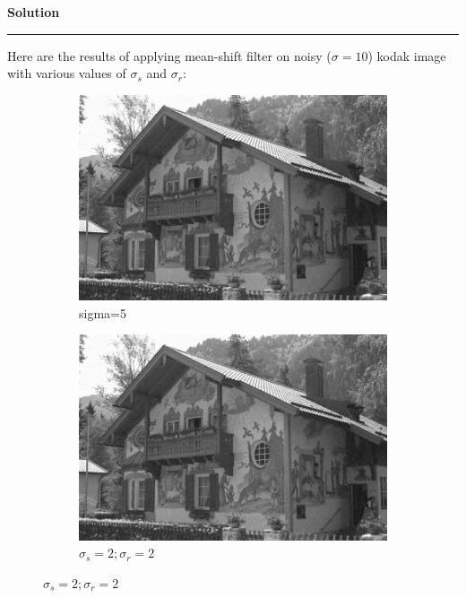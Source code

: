 \documentclass[a4paper]{article}
\newenvironment{solution}[2][]{%
    \begin{mdframed}[linecolor=green!60!black, linewidth=2pt, roundcorner=10pt, backgroundcolor=green!5!white, skipabove=12pt, skipbelow=12pt]%
        \textbf{\large #2} %
        \par\noindent\rule{\textwidth}{0.4pt} %
        \vspace{0.5em} %
}{%
    \end{mdframed}%
}
\begin{document}
\begin{solution}{Solution}
Here are the results of applying mean-shift filter on noisy ($\sigma = 10$) kodak image with various values of $\sigma_s$ and $\sigma_r$:

\begin{figure}[H]
    \centering
    \begin{subfigure}[b]{0.24\textwidth}
        \centering
        \includegraphics[width=\textwidth]{../images/noisy_kodak24_sigma_10.png}
        \caption{sigma=5}
        \label{Noisy }
    \end{subfigure}
    \begin{subfigure}[b]{0.24\textwidth}
        \centering
        \includegraphics[width=\textwidth]{../images/filtered_kodak24_meanshift_sigma_10_sigma_s_2_sigma_r_2.png}
        \caption{$\sigma_s=2;\sigma_r=2$}
        \label{fig:subfig2}
    \end{subfigure}

\end{figure}
\end{solution}
\end{document}

